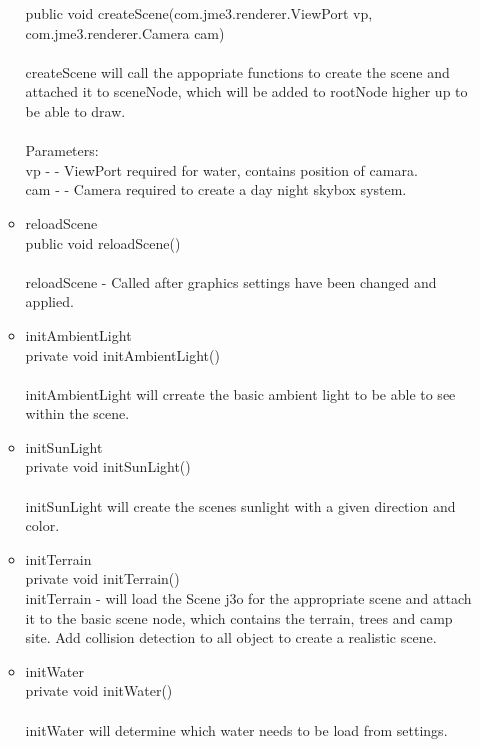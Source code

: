 \documentclass[letterpaper]{article}
\begin{document}
\begin{itemize}
\begin{itemize}
													public void createScene(com.jme3.renderer.ViewPort vp,
													               com.jme3.renderer.Camera cam) \\ \\
													createScene will call the appopriate functions to create the scene and attached it to sceneNode, which will be added to rootNode higher up to be able to draw. \\ \\
													Parameters: \\
													vp - - ViewPort required for water, contains position of camara. \\
													cam - - Camera required to create a day night skybox system. \\
											\item	reloadScene \\
													public void reloadScene() \\ \\
													reloadScene - Called after graphics settings have been changed and applied.
											\item	initAmbientLight \\
													private void initAmbientLight() \\ \\
													initAmbientLight will crreate the basic ambient light to be able to see within the scene. \\
											\item	initSunLight \\
													private void initSunLight() \\ \\
													initSunLight will create the scenes sunlight with a given direction and color.
											\item	initTerrain \\
													private void initTerrain() \\
													initTerrain - will load the Scene j3o for the appropriate scene and attach it to the basic scene node, which contains the terrain, trees and camp site. Add collision detection to all object to create a realistic scene. \\
											\item	initWater \\
													private void initWater() \\ \\
													initWater will determine which water needs to be load from settings.

\end{itemize}
\end{itemize}
\end{document}

